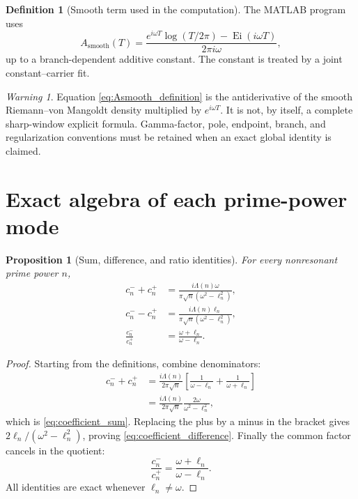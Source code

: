 \documentclass[11pt]{amsart}
\numberwithin{equation}{section}
\theoremstyle{plain}
\newtheorem{proposition}[theorem]{Proposition}
\theoremstyle{definition}
\newtheorem{definition}[theorem]{Definition}
\theoremstyle{remark}
\newtheorem{warning}[theorem]{Warning}
\DeclareMathOperator{\Ei}{Ei}
\newcommand{\1}{\mathbf{1}}
\begin{document}
\begin{definition}[Smooth term used in the computation]
\label{def:Asmooth}
The MATLAB program uses
\begin{equation}
A_{\mathrm{smooth}}(T)
=
\frac{
e^{i\omega T}\log(T/2\pi)-\Ei(i\omega T)
}{
2\pi i\omega
},
\label{eq:Asmooth_definition}
\end{equation}
up to a branch-dependent additive constant.  The constant is treated by
a joint constant--carrier fit.
\end{definition}

\begin{warning}
\label{warn:Asmooth_status}
Equation \eqref{eq:Asmooth_definition} is the antiderivative of the
smooth Riemann--von Mangoldt density multiplied by \(e^{i\omega T}\).
It is not, by itself, a complete sharp-window explicit formula.
Gamma-factor, pole, endpoint, branch, and regularization conventions must
be retained when an exact global identity is claimed.
\end{warning}

\section{Exact algebra of each prime-power mode}
\label{sec:mode_algebra}

\begin{proposition}[Sum, difference, and ratio identities]
\label{prop:coefficient_identities}
For every nonresonant prime power \(n\),
\begin{align}
c_n^-+c_n^+
&=
\frac{i\Lambda(n)\omega}
{\pi\sqrt n(\omega^2-\ell_n^2)},
\label{eq:coefficient_sum}
\\
c_n^--c_n^+
&=
\frac{i\Lambda(n)\ell_n}
{\pi\sqrt n(\omega^2-\ell_n^2)},
\label{eq:coefficient_difference}
\\
\frac{c_n^-}{c_n^+}
&=
\frac{\omega+\ell_n}{\omega-\ell_n}.
\label{eq:coefficient_ratio}
\end{align}
\end{proposition}

\begin{proof}
Starting from the definitions, combine denominators:
\begin{align}
c_n^-+c_n^+
&=
\frac{i\Lambda(n)}{2\pi\sqrt n}
\left[
\frac1{\omega-\ell_n}+\frac1{\omega+\ell_n}
\right]
\label{eq:coefficient_sum_proof_one}
\\
&=
\frac{i\Lambda(n)}{2\pi\sqrt n}
\frac{2\omega}{\omega^2-\ell_n^2},
\label{eq:coefficient_sum_proof_two}
\end{align}
which is \eqref{eq:coefficient_sum}.  Replacing the plus by a minus in
the bracket gives \(2\ell_n/(\omega^2-\ell_n^2)\), proving
\eqref{eq:coefficient_difference}.  Finally the common factor cancels in
the quotient:
\begin{equation}
\frac{c_n^-}{c_n^+}
=
\frac{\omega+\ell_n}{\omega-\ell_n}.
\label{eq:coefficient_ratio_proof}
\end{equation}
All identities are exact whenever \(\ell_n\neq\omega\).
\end{proof}
\end{document}
